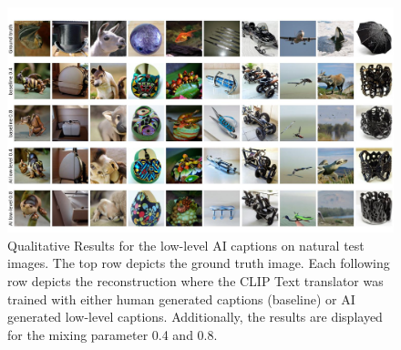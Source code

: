 \begin{figure}[ht]
    \centering
    \includegraphics[width=1\textwidth]{plots/aicap_qual_test.JPEG}
    \caption[Experiment 2: Reconstructed images for natural test images]{Qualitative Results for the low-level AI captions on natural test images. The top row depicts the ground truth image. Each following row depicts the reconstruction where the CLIP Text translator was trained with either human generated captions (baseline) or AI generated low-level captions. Additionally, the results are displayed for the mixing parameter 0.4 and 0.8.}\label{fig:aicap_qual_test}
\end{figure}

